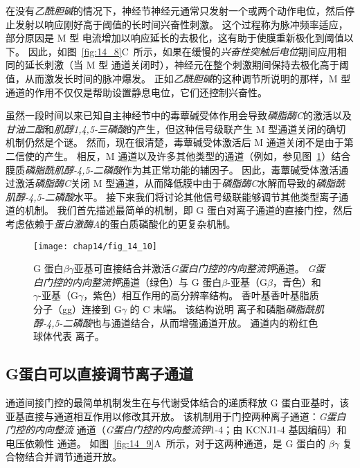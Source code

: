 在没有\textit{乙酰胆碱}的情况下，神经节神经元通常只发射一个或两个动作电位，然后停止发射以响应刚好高于阈值的长时间兴奋性刺激。
这个过程称为脉冲频率适应，部分原因是 M 型  电流增加以响应延长的去极化，这有助于使膜重新极化到阈值以下。
因此，如图~\ref{fig:14_8}C~所示，如果在缓慢的\textit{兴奋性突触后电位}期间应用相同的延长刺激（当 M 型  通道关闭时），神经元在整个刺激期间保持去极化高于阈值，从而激发长时间的脉冲爆发。
正如\textit{乙酰胆碱}的这种调节所说明的那样，M 型  通道的作用不仅仅是帮助设置静息电位，它们还控制兴奋性。


虽然一段时间以来已知自主神经节中的毒蕈碱受体作用会导致\textit{磷脂酶C}的激活以及\textit{甘油二酯}和\textit{肌醇1,4,5-三磷酸}的产生，但这种信号级联产生 M 型通道关闭的确切机制仍然是个谜。
然而，现在很清楚，毒蕈碱受体激活后 M 通道关闭不是由于第二信使的产生。
相反，M 通道以及许多其他类型的通道（例如，参见图~\ref{fig:14_10}）结合膜质\textit{磷脂酰肌醇-4,5-二磷酸}作为其正常功能的辅因子。
因此，毒蕈碱受体激活通过激活\textit{磷脂酶C}关闭 M 型通道，从而降低膜中由于\textit{磷脂酶C}水解而导致的\textit{磷脂酰肌醇-4,5-二磷酸}水平。
接下来我们将讨论其他信号级联能够调节其他类型离子通道的机制。
我们首先描述最简单的机制，即 G 蛋白对离子通道的直接门控，然后考虑依赖于\textit{蛋白激酶A}的蛋白质磷酸化的更复杂机制。


\begin{figure}[htbp]
	\centering
	\texttt{[image: chap14/fig\_14\_10]}
	\caption{G 蛋白$\beta\gamma$亚基可直接结合并激活\textit{G蛋白门控的内向整流钾}通道。
		\textit{G蛋白门控的内向整流钾}通道（绿色）与 G 蛋白$\beta$-亚基（G$\beta$，青色）和 $\gamma$-亚基（G$\gamma$，紫色）相互作用的高分辨率结构。
		香叶基香叶基脂质分子（gg）连接到 G$\gamma$ 的 C 末端。
		该结构说明  离子和磷脂\textit{磷脂酰肌醇-4,5-二磷酸}也与通道结合，从而增强通道开放。
		通道内的粉红色球体代表  离子\cite{whorton2013x}。}
	\label{fig:14_10}
\end{figure}



\subsection{G蛋白可以直接调节离子通道}

通道间接门控的最简单机制发生在与代谢受体结合的递质释放 G 蛋白亚基时，该亚基直接与通道相互作用以修改其开放。
该机制用于门控两种离子通道：\textit{G蛋白门控的内向整流}  通道（\textit{G蛋白门控的内向整流钾}1-4；由 KCNJ1-4 基因编码）和电压依赖性  通道。
如图~\ref{fig:14_9}A~所示，对于这两种通道，是 G 蛋白的 $\beta \gamma$ 复合物结合并调节通道开放。


